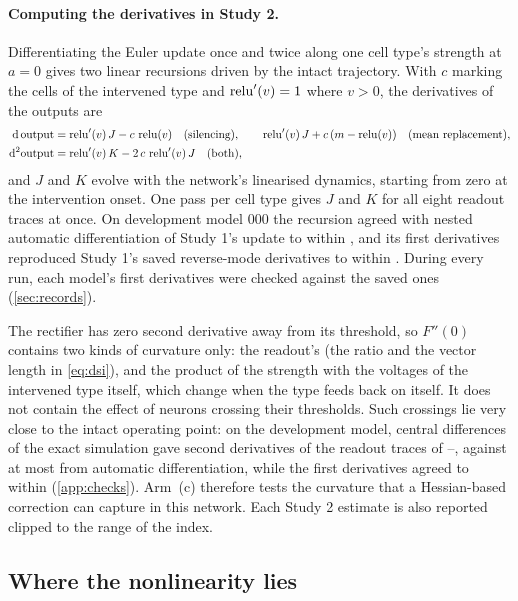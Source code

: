 \paragraph{Computing the derivatives in Study 2.} Differentiating the Euler update once and twice along one cell type's strength at $a=0$ gives two linear recursions driven by the intact trajectory. With $c$ marking the cells of the intervened type and $\operatorname{relu}'(v)=1$ where $v>0$, the derivatives of the outputs are
\begin{align}
\mathrm{d}\,\text{output} &= \operatorname{relu}'(v)\,J - c\,\operatorname{relu}(v) \quad\text{(silencing)}, \qquad \operatorname{relu}'(v)\,J + c\,(m-\operatorname{relu}(v)) \quad\text{(mean replacement)},\\
\mathrm{d}^2\text{output} &= \operatorname{relu}'(v)\,K - 2\,c\,\operatorname{relu}'(v)\,J \quad\text{(both)},
\end{align}
and $J$ and $K$ evolve with the network's linearised dynamics, starting from zero at the intervention onset. One pass per cell type gives $J$ and $K$ for all eight readout traces at once. On development model 000 the recursion agreed with nested automatic differentiation of Study 1's update to within \PilotAutodiffMax{}, and its first derivatives reproduced Study 1's saved reverse-mode derivatives to within \PilotGradMax{}. During every run, each model's first derivatives were checked against the saved ones (\cref{sec:records}).

The rectifier has zero second derivative away from its threshold, so $F''(0)$ contains two kinds of curvature only: the readout's (the ratio and the vector length in \cref{eq:dsi}), and the product of the strength with the voltages of the intervened type itself, which change when the type feeds back on itself. It does not contain the effect of neurons crossing their thresholds. Such crossings lie very close to the intact operating point: on the development model, central differences of the exact simulation gave second derivatives of the readout traces of \PilotFDKMin{}--\PilotFDKMax{}, against at most \PilotAutoKMax{} from automatic differentiation, while the first derivatives agreed to within \PilotFDJMax{} (\cref{app:checks}). Arm~(c) therefore tests the curvature that a Hessian-based correction can capture in this network. Each Study 2 estimate is also reported clipped to the range of the index.

\subsection{Where the nonlinearity lies}
\label{sec:counterfactual}


